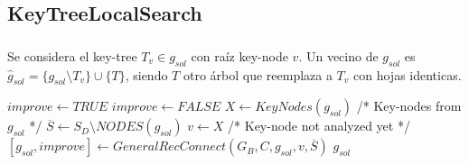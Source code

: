 \subsection{KeyTreeLocalSearch}
\begin{frame}\frametitle{}
\begin{definition}
Se considera el key-tree $T_v \in g_{sol}$ con raíz key-node $v$.  
Un vecino de $g_{sol}$ es $\hat{g}_{sol} = \{ g_{sol}\setminus T_v \} \cup \{T\}$, siendo 
$T$ otro árbol que reemplaza a $T_v$ con hojas identicas. 
\end{definition}
\begin{block}{}
\begin{algorithm}[H]
\caption{$g_{sol} = KeyTreeLocalSearch(G_B,C,g_{sol})$}
\begin{algorithmic}[1]
\begin{scriptsize}
\STATE $improve \leftarrow TRUE$
\STATE $improve \leftarrow FALSE$
\STATE $ X \leftarrow KeyNodes(g_{sol})$ /* Key-nodes from $g_{sol}$ */
\STATE $\overline{S} \leftarrow S_D \setminus NODES(g_{sol})$
\STATE $v \leftarrow X$ /* Key-node not analyzed yet */
\STATE $[g_{sol},improve] \leftarrow GeneralRecConnect(G_B,C,g_{sol},v,\overline{S})$
\ENDWHILE
\ENDWHILE
\RETURN $g_{sol}$
\end{scriptsize}
\end{algorithmic}
\end{algorithm}
\end{block}
\end{frame}

